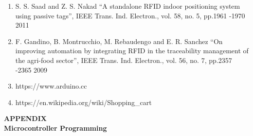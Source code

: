 \documentclass[12pt]{article}
\begin{document}
\begin{enumerate}
\item S. S. Saad and Z. S. Nakad “A standalone RFID indoor positioning system using passive tags”, IEEE Trans. Ind. Electron., vol. 58, no. 5, pp.1961 -1970 2011 
\item F. Gandino, B. Montrucchio, M. Rebaudengo and E. R. Sanchez “On improving automation by integrating RFID in the traceability management of the agri-food sector”, IEEE Trans. Ind. Electron., vol. 56, no. 7, pp.2357 -2365 2009 
\item https://www.arduino.cc
\item https://en.wikipedia.org/wiki/Shopping{\_}cart
\end{enumerate}

\newpage
{}
\begin{center}
\large\textbf{APPENDIX}\\ 
\textbf{Microcontroller Programming}
\end{center}
\end{document}
